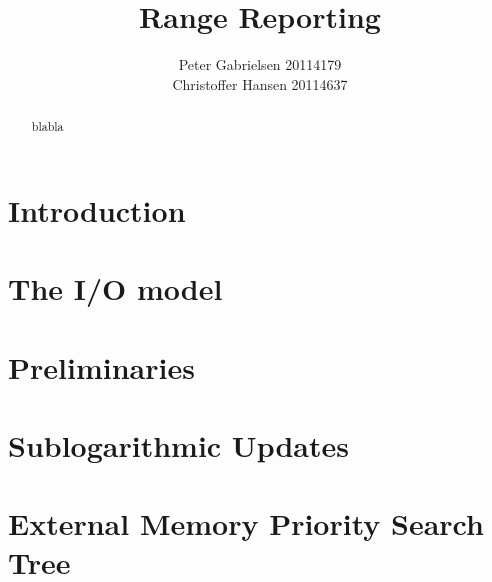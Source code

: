 \documentclass[a4paper,oneside,article,11pt]{memoir}
\title{Range Reporting}
\author{Peter Gabrielsen 20114179 \\
Christoffer Hansen 20114637}
\begin{document}
\begin{titlingpage}
\clearpage

\maketitle
\thispagestyle{empty}

\begin{abstract}
blabla
\end{abstract}
\end{titlingpage}

\pagebreak

\tableofcontents

\pagebreak

\chapter{Introduction}


\chapter{The I/O model}

\chapter{Preliminaries}

\chapter{Sublogarithmic Updates}

\chapter{External Memory Priority Search Tree}


\end{document}
